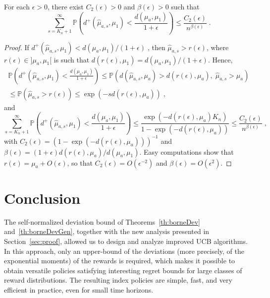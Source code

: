 \documentclass[wcp]{jmlr}
\renewcommand{\P}{\mathbb{P}}
\newcommand{\1}{\mathbbm{1}}
\begin{document}
{\begin{lemma}\label{lem:majSumProba}
  For each $\epsilon>0$, there exist $C_2(\epsilon)>0$ and $\beta(\epsilon)>0$
  such that
  \[\sum_{s=K_n+1}^\infty \P\left(d^+(\hat{\mu}_{a,s}, \mu_1) < \frac{d(\mu_a,
      \mu_1) }{1+\epsilon} \right) \leq
  \frac{C_2(\epsilon)}{n^{\beta(\epsilon)}}\;.\]
\end{lemma}
\begin{proof}
  If $d^+(\hat{\mu}_{a,s}, \mu_1) < d(\mu_a, \mu_1)/(1+\epsilon)\;$, then
  $\hat{\mu}_{a,s}> r(\epsilon)$, where $r(\epsilon)\in ]\mu_a, \mu_1[$ is such
  that $d(r(\epsilon), \mu_1) = d(\mu_a, \mu_1)/(1+\epsilon)$.
  Hence, \begin{multline*}\P\left(d^+(\hat{\mu}_{a,s}, \mu_1)< \frac{d(\mu_a,
        \mu_1) }{1+\epsilon}\right) \leq \P\left( d(\hat{\mu}_{a,s}, \mu_a) >
      d(r(\epsilon), \mu_a),\;\hat{\mu}_{a,s}>\mu_a \right) \\\leq
    \P(\hat{\mu}_{a,s}> r(\epsilon)) \leq \exp(-s d(r(\epsilon), \mu_a))
    \;,\end{multline*} and
  \[\sum_{s=K_n+1}^\infty \P\left(d^+(\hat{\mu}_{a,s}, \mu_1) < \frac{d(\mu_a,
      \mu_1)}{1+\epsilon} \right) \leq \frac{\exp(-d(r(\epsilon),\mu_a)
    K_n)}{1-\exp(-d(r(\epsilon),\mu_a))} \leq
  \frac{C_2(\epsilon)}{n^{\beta(\epsilon)}}\;,\] with
  $C_2(\epsilon)=(1-\exp(-d(r(\epsilon),\mu_a)))^{-1}$ and $\beta(\epsilon) =
  (1+\epsilon)d(r(\epsilon), \mu_a)/d(\mu_a, \mu_1)$.  Easy computations show
  that $r(\epsilon) = \mu_a+O(\epsilon)$, so that $C_2(\epsilon) =
  O(\epsilon^{-2} )$ and $\beta(\epsilon) = O(\epsilon^{2})$.
\end{proof}



\section{Conclusion}\label{sec:conclusion}
The self-normalized deviation bound of Theorems~\ref{th:borneDev} and~\ref{th:borneDevGen}, together with the new analysis presented in Section~\ref{sec:proof}, allowed us to design and analyze improved UCB algorithms.
In this approach, only an upper-bound of the deviations (more precisely, of the exponential moments) of the rewards is required, which makes it possible to obtain versatile policies satisfying interesting regret bounds for large classes of reward distributions.
The resulting index policies are simple, fast, and very efficient in practice, even for small time horizons. 



}
\end{document}

